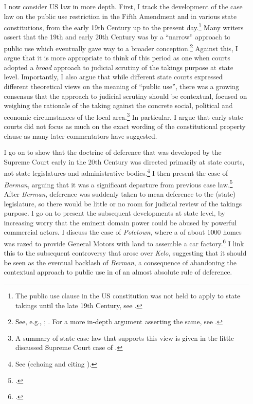 I now consider US law in more depth. First, I track the development of the case law on the public use restriction in the Fifth Amendment and in various state constitutions, from the early 19th Century up to the present day.\footnote{The public use clause in the US constitution was not held to apply to state takings until the late 19th Century, see \cite{chicago97}.} Many writers assert that the 19th and early 20th Century was  by a ``narrow'' approach to public use which eventually gave way to a broader conception.\footnote{See, e.g., \cite[483]{walt11}; \cite[203-204]{allen00}. For a more in-depth argument asserting the same, see \cite{nichols40}.} Against this, I argue that it is more appropriate to think of this period as one when courts adopted a {\it broad} approach to judicial scrutiny of the takings purpose at state level. Importantly, I also argue that while different state courts expressed different theoretical views on the meaning of ``public use'', there was a growing consensus that the approach to judicial scrutiny should be contextual, focused on weighing the rationale of the taking against the concrete social, political and economic circumstances of the local area.\footnote{A summary of state case law that supports this view is given in the little discussed Supreme Court case of \cite{hairston08}.}  In particular, I argue that early state courts did not focus as much on the exact wording of the constitutional property clause as many later commentators have suggested.

I go on to show that the doctrine of deference that was developed by the Supreme Court early in the 20th Century was directed primarily at state courts, not state legislatures and administrative bodies.\footnote{See \cite{vester30} (echoing and citing \cite{hairston08}).} I then present the case of {\it Berman}, arguing that it was a significant departure from previous case law.\footcite{berman54} After {\it Berman}, deference was suddenly taken to mean deference to the (state) legislature, so there would be little or no room for judicial review of the takings purpose. I go on to present the subsequent developments at state level,  by increasing worry that the eminent domain power could be abused by powerful commercial actors. I discuss the case of {\it Poletown}, where a  of about 1000 homes was razed to provide General Motors with land to assemble a car factory.\footcite{poletown81} I link this to the subsequent controversy that arose over {\it Kelo}, suggesting that it should be seen as the eventual backlash of {\it Berman}, a consequence of abandoning the contextual approach to public use in  of an almost absolute rule of deference.


